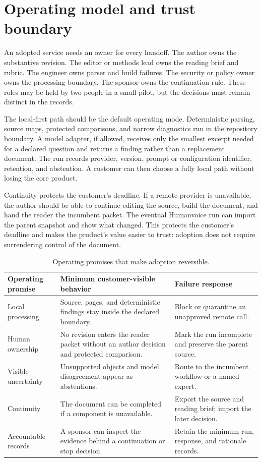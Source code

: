 \section{Operating model and trust boundary}
\label{sec:adoption-operating}

An adopted service needs an owner for every handoff. The author owns the
substantive revision. The editor or methods lead owns the reading brief and
rubric. The engineer owns parser and build failures. The security or policy
owner owns the processing boundary. The sponsor owns the continuation rule.
These roles may be held by two people in a small pilot, but the decisions must
remain distinct in the records.

The local-first path should be the default operating mode. Deterministic
parsing, source maps, protected comparisons, and narrow diagnostics run in
the repository boundary. A model adapter, if allowed, receives only the
smallest excerpt needed for a declared question and returns a finding rather
than a replacement document. The run records provider, version, prompt or
configuration identifier, retention, and abstention. A customer can then
choose a fully local path without losing the core product.

Continuity protects the customer's deadline. If a
remote provider is unavailable, the author should be able to continue editing
the source, build the document, and hand the reader the incumbent packet. The
eventual Humanvoice run can import the parent snapshot and show what changed.
This protects the customer's deadline and makes the product's value easier to
trust: adoption does not require surrendering control of the document.

\begin{table}[H]
\centering
\small
\begin{tabularx}{\textwidth}{@{}p{}p{}L@{}}
\toprule
Operating promise & Minimum customer-visible behavior & Failure response \\
\midrule
Local processing & Source, pages, and deterministic findings stay inside the
declared boundary. & Block or quarantine an unapproved remote call. \\
Human ownership & No revision enters the reader packet without an author
decision and protected comparison. & Mark the run incomplete and preserve the
parent source. \\
Visible uncertainty & Unsupported objects and model disagreement appear as
abstentions. & Route to the incumbent workflow or a named expert. \\
Continuity & The document can be completed if a component is unavailable. &
Export the source and reading brief; import the later decision. \\
Accountable records & A sponsor can inspect the evidence behind a continuation
or stop decision. & Retain the minimum run, response, and rationale records. \\
\bottomrule
\end{tabularx}
\caption{Operating promises that make adoption reversible.}
\label{tab:operating-promises}
\end{table}


